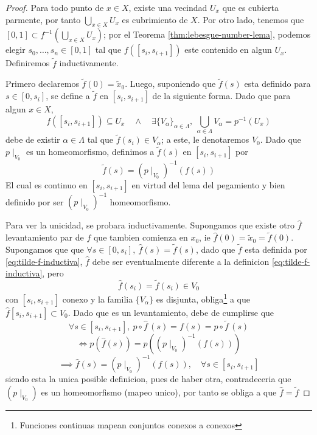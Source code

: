 \begin{proof}
  Para todo punto de \(x \in X\), existe una vecindad \(U_x\) que es
  cubierta parmente, por tanto \(\bigcup_{x \in X} U_x\) es cubrimiento de
  \(X\). Por otro lado, tenemos que \( [0,1] \subset f^{-1} (\bigcup_{x
  \in X} U_x)\); por el Teorema \ref{thm:lebesgue-number-lema}, podemos
  elegir \(s_0,\dotsc,s_n \in [0,1]\) tal que \(f([s_i, s_{i+1}])\) este contenido
  en algun \(U_x\). Definiremos \(\tilde f\) inductivamente.

  Primero declaremos \(\tilde f (0) = \tilde x _0\). Luego, suponiendo
  que \(\tilde f (s)\) esta definido para \(s \in [0, s_i]\), se
  define a \(\tilde f \) en \([s_i, s_{i+1}]\) de la siguiente forma.
  Dado que para algun \(x \in X\),
  \[f ([s_i, s_{i+1}]) \subseteq U_x \quad \land \quad \exists
    \{V_\alpha\}_{\alpha \in \Lambda},\ \bigcup_{\alpha \in \Lambda}
    V_\alpha = p^{-1} (U_x)\]
  debe de existir \(\alpha \in \Lambda\) tal que \(\tilde f (s_i) \in
  V_\alpha\); a este, le denotaremos \(V_0\). Dado que \(p \mid_{V_0}\) es un
  homeomorfismo, definimos a \(\tilde f (s)\) en \([s_i, s_{i+1}]\) por
  \begin{equation}
  \tilde f (s) = (p \mid _{V_0})^{-1} (f(s))\label{eq:tilde-f-inductiva}
  \end{equation}
  El cual es continuo en \([s_i, s_{i+1}]\) en virtud del lema del
  pegamiento y bien definido por ser \((p \mid _{V_0})^{-1} \) homeomorfismo.

  Para ver la unicidad, se probara inductivamente. Supongamos que existe
  otro \(\hat{f}\) levantamiento par de \(f\) que tambien
  comienza en \(x_0\), ie \(\hat{f} (0) = \tilde x _0 = \tilde f
  (0)\). Supongamos que que \(\forall s \in [0, s_i],\ \hat{f}
  (s) = \tilde f (s)\), dado que \(\tilde f\) esta definida por
  \eqref{eq:tilde-f-inductiva}, \(\hat f\) debe ser
  eventualmente diferente a la definicion \eqref{eq:tilde-f-inductiva},
  pero
  \[\hat f (s_i) = \tilde f (s_i) \in V_0\]
  con \([s_i, s_{i+1}]\) conexo y la familia \(\{V_\alpha\}\)
  es disjunta, obliga\footnote{Funciones continuas mapean conjuntos
    conexos a conexos} a que \(\hat f [s_i, s_{i+1}] \subset
  V_0\). Dado que es un levantamiento, debe de cumplirse que
  \[\forall s \in [s_i, s_{i+1}],\ p \circ \hat f \, (s) =
    f(s) = p \circ \tilde f \, (s) \]
  \[ \iff p ( \hat f (s)) = p ((p \mid_{V_0})^{-1} (f (s)))\]
  \[ \implies \hat f (s) = (p \mid_{V_0})^{-1} (f (s)), \quad \forall s
      \in [s_i, s_{i+1}]\]
  siendo esta la unica posible definicion, pues de haber otra,
  contradeceria que \((p \mid_{V_0})\) es un homeomorfismo (mapeo
  unico), por tanto se obliga a que \( \hat f = \tilde f\)
\end{proof}
